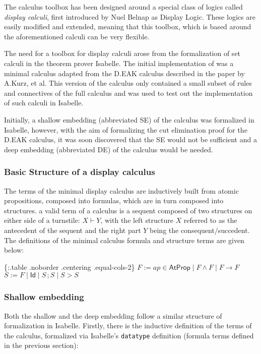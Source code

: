 The calculus toolbox has been designed around a special class of logics
called \emph{display calculi}, first introduced by Nuel Belnap as
Display Logic. These logics are easily modified and extended, meaning
that this toolbox, which is based around the aforementioned calculi can
be very flexible.

The need for a toolbox for display calculi arose from the formalization
of set calculi in the theorem prover Isabelle. The initial
implementation of was a minimal calculus adapted from the D.EAK calculus
described in the paper by A.Kurz, et al. This version of the calculus
only contained a small subset of rules and connectives of the full
calculus and was used to test out the implementation of such calculi in
Isabelle.

Initially, a shallow embedding (abbreviated SE) of the calculus was
formalized in Isabelle, however, with the aim of formalizing the cut
elimination proof for the D.EAK calculus, it was soon discovered that
the SE would not be sufficient and a deep embedding (abbreviated DE) of
the calculus would be needed.

\subsubsection{Basic Structure of a display
calculus}\label{basic-structure-of-a-display-calculus}

The terms of the minimal display calculus are inductively built from
atomic propositions, composed into formulas, which are in turn composed
into structures. a valid term of a calculus is a sequent composed of two
structures on either side of a turnstile: $X \vdash Y$, with the left
structure $X$ referred to as the antecedent of the sequent and the right
part $Y$ being the consequent/succedent. The definitions of the minimal
calculus formula and structure terms are given below:

\{:.table .noborder .centering .equal-cols-2\} \textbar{}
$F:= ap \in \mathsf{AtProp} \mid F \land F \mid F \rightarrow F$
\textbar{} $S:= F \mid \mathsf{Id} \mid S \,; S \mid S > S$ \textbar{}

\subsubsection{Shallow embedding}\label{shallow-embedding}

Both the shallow and the deep embedding follow a similar structure of
formalization in Isabelle. Firstly, there is the inductive definition of
the terms of the calculus, formalized via Isabelle's \texttt{datatype}
definition (formula terms defined in the previous section):

